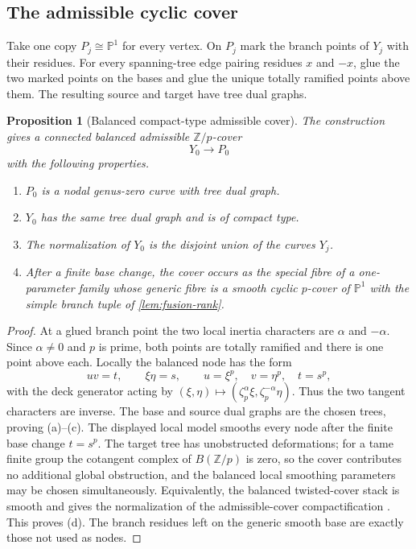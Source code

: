 \documentclass[11pt]{article}
\newtheorem{proposition}[theorem]{Proposition}
\theoremstyle{definition}
\theoremstyle{remark}
\newcommand{\Z}{\mathbb Z}
\newcommand{\PP}{\mathbb P}
\begin{document}
\subsection{The admissible cyclic cover}

Take one copy $P_j\cong\PP^1$ for every vertex.  On $P_j$ mark the branch points of $Y_j$ with their residues.  For every spanning-tree edge pairing residues $x$ and $-x$, glue the two marked points on the bases and glue the unique totally ramified points above them.  The resulting source and target have tree dual graphs.

\begin{proposition}[Balanced compact-type admissible cover]\label{prop:admissible}
The construction gives a connected balanced admissible $\Z/p$-cover
\[
 Y_0\longrightarrow P_0
\]
with the following properties.
\begin{enumerate}[label=\textup{(\alph*)}]
\item $P_0$ is a nodal genus-zero curve with tree dual graph.
\item $Y_0$ has the same tree dual graph and is of compact type.
\item The normalization of $Y_0$ is the disjoint union of the curves $Y_j$.
\item After a finite base change, the cover occurs as the special fibre of a one-parameter family whose generic fibre is a smooth cyclic $p$-cover of $\PP^1$ with the simple branch tuple of \cref{lem:fusion-rank}.
\end{enumerate}
\end{proposition}

\begin{proof}
At a glued branch point the two local inertia characters are $\alpha$ and $-\alpha$.  Since $\alpha\ne0$ and $p$ is prime, both points are totally ramified and there is one point above each.  Locally the balanced node has the form
\[
 uv=t,\qquad \xi\eta=s,\qquad u=\xi^p,\quad v=\eta^p,\quad t=s^p,
\]
with the deck generator acting by $(\xi,\eta)\mapsto(\zeta_p^{\alpha}\xi,\zeta_p^{-\alpha}\eta)$.  Thus the two tangent characters are inverse.  The base and source dual graphs are the chosen trees, proving (a)--(c).  The displayed local model smooths every node after the finite base change $t=s^p$.  The target tree has unobstructed deformations; for a tame finite group the cotangent complex of $B(\Z/p)$ is zero, so the cover contributes no additional global obstruction, and the balanced local smoothing parameters may be chosen simultaneously.  Equivalently, the balanced twisted-cover stack is smooth and gives the normalization of the admissible-cover compactification \cite{ACV}.  This proves (d).  The branch residues left on the generic smooth base are exactly those not used as nodes.
\end{proof}
\end{document}
